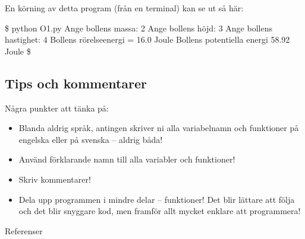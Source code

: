 \documentclass{beamer}
\begin{document}
\begin{frame}{\insertsubsectionhead}
  
\end{frame}

\begin{frame}[fragile]{\insertsubsectionhead}
  En körning av detta program (från en terminal) kan se ut så här:
  \begin{terminal}
\$ python O1.py
Ange bollens massa: 2
Ange bollens höjd: 3
Ange bollens hastighet: 4
Bollens rörelseenergi =  16.0 Joule
Bollens potentiella energi 58.92 Joule
\$
  \end{terminal}
\end{frame}

\subsection{Tips och kommentarer}

\begin{frame}{\insertsubsectionhead}
  Några punkter att tänka på:
  \begin{itemize}
    \item Blanda aldrig språk, antingen skriver ni alla variabelnamn och 
      funktioner på engelska eller på svenska -- aldrig båda!

    \item Använd förklarande namn till alla variabler och funktioner!

    \item Skriv kommentarer!

    \item Dela upp programmen i mindre delar -- funktioner! Det blir lättare 
      att följa och det blir snyggare kod, men framför allt mycket enklare att 
      programmera!

  \end{itemize}
\end{frame}




\begin{frame}{Referenser}
  
\end{frame}
\end{document}
